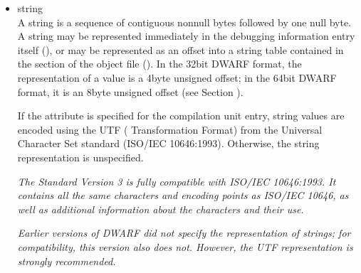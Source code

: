 \begin{itemize}
The third type of reference can identify any debugging
information type entry that has been placed in its own
. This type of 
reference () is the
64\dash bit type signature 
(see Section ) 
that was computed
for the type.

\textit{The use of compilation unit relative references will reduce the
number of link\dash time relocations and so speed up linking. The
use of the second and third type of reference allows for the
sharing of information, such as types, across compilation
units.}

\textit{A reference to any kind of compilation unit identifies the
debugging information entry for that unit, not the preceding
header.}

\item string \\
A string is a sequence of contiguous non\dash null bytes followed by
one null byte. 
A string may be represented immediately in the
debugging information entry itself 
(), or may
be represented as an 
offset into a string table contained in
the  section of the object file 
(). In
the 32\dash bit DWARF format, the representation of a 
value is a 4\dash byte unsigned offset; in the 64\dash bit DWARF format,
it is an 8\dash byte unsigned offset 
(see Section ).

If the 
 attribute is specified for the
compilation unit entry, string values are encoded using the
UTF ( Transformation Format) from the Universal
Character Set standard (ISO/IEC 10646:1993). Otherwise,
the string representation is unspecified.

\textit{The  Standard Version 3 is fully compatible with
ISO/IEC 10646:1993. It contains all the same characters
and encoding points as ISO/IEC 10646, as well as additional
information about the characters and their use.}

\textit{Earlier versions of DWARF did not specify the representation
of strings; for compatibility, this version also does
not. However, the UTF representation is strongly recommended.}

\end{itemize}

